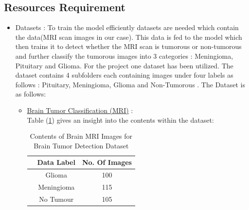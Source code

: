 \subsection{Resources Requirement}
    \begin{itemize}
    \item Datasets : To train the model efficiently datasets are needed which contain the data(MRI scan images in our case). This data is fed to the model which then trains it to detect whether the MRI scan is tumorous or non-tumorous and further classify the tumorous images into 3 categories : Meningioma, Pituitary and Glioma. For the project one dataset has been utilized. The dataset contains 4 subfolders each containing images under four labels as follows : Pituitary, Meningioma, Glioma and Non-Tumorous . The Dataset is as follows:
        \begin{itemize}
            \item \href{https://www.kaggle.com/datasets/sartajbhuvaji/brain-tumor-classification-mri}{Brain Tumor Classification (MRI)} : \\
                Table (\ref{tab:Dataset}) gives an insight into the contents within the dataset: 
\begin{table}[h!]
                \caption{Contents of Brain MRI Images for Brain Tumor Detection Dataset}
                \label{tab:Dataset}
\begin{tabular}{c|c|c|}
\cline{2-3}
\multicolumn{1}{l|}{}                                                                                                        & \cellcolor[HTML]{CBCEFB}\textbf{Data Label} & \cellcolor[HTML]{CBCEFB}\textbf{No. Of Images} \\ \hline
\multicolumn{1}{|c|}{\cellcolor[HTML]{CBCEFB}}                                                                               & Glioma                                      & 100                                            \\ \cline{2-3} 
\multicolumn{1}{|c|}{\cellcolor[HTML]{CBCEFB}}                                                                               & Meningioma                                  & 115                                            \\ \cline{2-3} 
\multicolumn{1}{|c|}{\cellcolor[HTML]{CBCEFB}}                                                                               & No Tumour                                   & 105                                            \\ \cline{2-3} 

\end{tabular}
\end{table}
\end{itemize}
\end{itemize}
